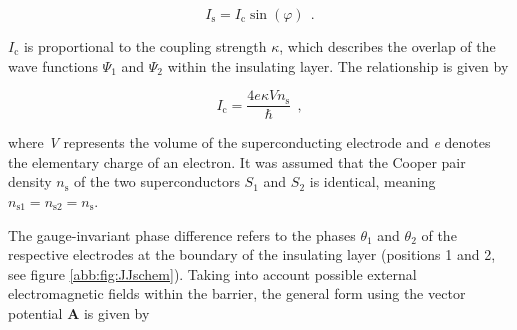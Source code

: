 
 

\begin{equation}
\label{1.JE}
I_\mathrm{s} = I_\mathrm{c}\sin(\varphi) \ \ .
\end{equation}


$I_\mathrm{c}$ is proportional to the coupling strength $\kappa$, which describes the overlap of the wave functions $\Psi_1$ and $\Psi_2$ within the insulating layer. The relationship is given by

\begin{equation}
I_\mathrm{c} = \frac{4e\kappa V n_\mathrm{s}}{\hbar} \ \ ,
\end{equation}


where \textit{V} represents the volume of the superconducting electrode and \textit{e} denotes the elementary charge of an electron. It was assumed that the Cooper pair density $n_\mathrm{s}$ of the two superconductors $S_1$ and $S_2$ is identical, meaning $n_{\mathrm{s}1} = n_{\mathrm{s}2} = n_\mathrm{s}$.

The gauge-invariant phase difference refers to the phases $\theta_1$ and $\theta_2$ of the respective electrodes at the boundary of the insulating layer (positions 1 and 2, see figure \ref{abb:fig:JJschem}). Taking into account possible external electromagnetic fields within the barrier, the general form using the vector potential \textbf{A} is given by \cite{Gross2016}

